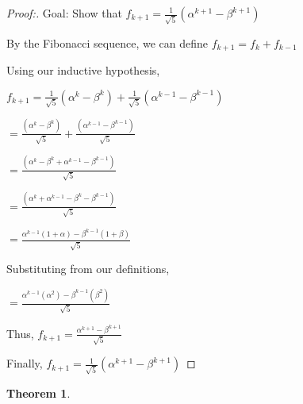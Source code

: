 \documentclass[12pt]{article}
\newtheorem{theorem}{Theorem}[section]
\begin{document}
\begin{proof}[Proof:]
    Goal: Show that $f_{k+1} = \frac{1}{\sqrt{5}} (\alpha^{k+1} - \beta^{k+1})$

    By the Fibonacci sequence, we can define $f_{k+1} = f_{k} + f_{k - 1}$

    Using our inductive hypothesis, 
    
    $f_{k+1} = \frac{1}{\sqrt{5}}(\alpha^k - \beta^k) + \frac{1}{\sqrt{5}}(\alpha^{k-1} - \beta^{k-1})$

    $= \frac{(\alpha^k - \beta^k)}{\sqrt{5}} + \frac{(\alpha^{k-1} - \beta^{k-1})}{\sqrt{5}}$

    $= \frac{(\alpha^k - \beta^k + \alpha^{k-1} - \beta^{k-1})}{\sqrt{5}}$

    $= \frac{(\alpha^k + \alpha^{k-1} - \beta^k - \beta^{k-1})}{\sqrt{5}}$

    $= \frac{\alpha^{k-1}(1 + \alpha) - \beta^{k-1}(1 + \beta)}{\sqrt{5}}$

    Substituting from our definitions, 
    
    $= \frac{\alpha^{k-1}(\alpha^2) - \beta^{k-1}(\beta^2)}{\sqrt{5}}$

    Thus, $f_{k+1} = \frac{\alpha^{k+1} - \beta^{k+1}}{\sqrt{5}}$

    Finally, $f_{k+1} = \frac{1}{\sqrt{5}}(\alpha^{k+1} - \beta^{k+1})$
\end{proof}

\newpage

\begin{theorem}
\end{theorem}
\end{document}
